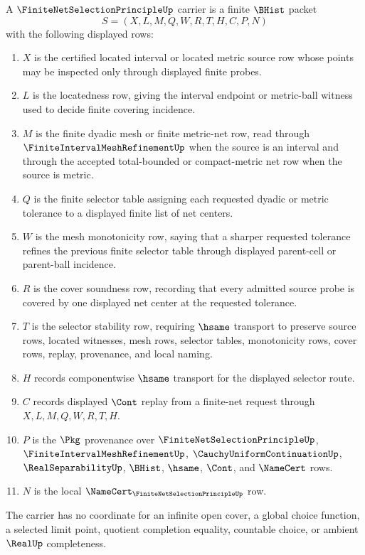 \begin{definition}
\label{def:finite-net-selection-principle-carrier}
A $\FiniteNetSelectionPrincipleUp$ carrier is a finite $\BHist$ packet
$$
S=(X,L,M,Q,W,R,T,H,C,P,N)
$$
with the following displayed rows:
\begin{enumerate}
\item $X$ is the certified located interval or located metric source row whose points may be inspected only through displayed finite probes.
\item $L$ is the locatedness row, giving the interval endpoint or metric-ball witness used to decide finite covering incidence.
\item $M$ is the finite dyadic mesh or finite metric-net row, read through $\FiniteIntervalMeshRefinementUp$ when the source is an interval and through the accepted total-bounded or compact-metric net row when the source is metric.
\item $Q$ is the finite selector table assigning each requested dyadic or metric tolerance to a displayed finite list of net centers.
\item $W$ is the mesh monotonicity row, saying that a sharper requested tolerance refines the previous finite selector table through displayed parent-cell or parent-ball incidence.
\item $R$ is the cover soundness row, recording that every admitted source probe is covered by one displayed net center at the requested tolerance.
\item $T$ is the selector stability row, requiring $\hsame$ transport to preserve source rows, located witnesses, mesh rows, selector tables, monotonicity rows, cover rows, replay, provenance, and local naming.
\item $H$ records componentwise $\hsame$ transport for the displayed selector route.
\item $C$ records displayed $\Cont$ replay from a finite-net request through $X,L,M,Q,W,R,T,H$.
\item $P$ is the $\Pkg$ provenance over $\FiniteNetSelectionPrincipleUp$, $\FiniteIntervalMeshRefinementUp$, $\CauchyUniformContinuationUp$, $\RealSeparabilityUp$, $\BHist$, $\hsame$, $\Cont$, and $\NameCert$ rows.
\item $N$ is the local $\NameCert_{\FiniteNetSelectionPrincipleUp}$ row.
\end{enumerate}
The carrier has no coordinate for an infinite open cover, a global choice function, a selected limit point, quotient completion equality, countable choice, or ambient $\RealUp$ completeness.
\end{definition}


